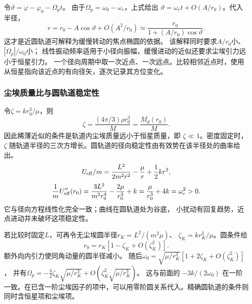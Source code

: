 \documentclass[UTF8,fontset=fandol,a4paper,11pt]{ctexart}
\begin{document}
令$\vartheta=\varphi-\varphi_0-\Omega_pt$。
由于$\Omega_p=\omega_0-\omega_r$，上式给出
$\vartheta=\omega_rt+O(A/r_0)$。代入半径，
\[
r=r_0-A\cos\vartheta+O(A^2/r_0)
\simeq\frac{r_0}{1+(A/r_0)\cos\vartheta}.
\]
这才是近圆轨道可解释为缓慢转动的焦点椭圆的依据。
该解释同时要求$A/r_0$小、$|\Omega_p|/\omega_0$小；
线性振动频率适用于小径向振幅，缓慢进动的近似还要求尘埃引力远小于恒星引力。
一个径向周期中取一次近点、一次远点。比较相邻近点时，使用从恒星指向该近点的有向径矢，逐次记录其方位变化。

\subsubsection*{尘埃质量比与圆轨道稳定性}
令$\zeta=k r_0^3/\mu$，则
\[
\zeta=\frac{(4\pi/3)\rho r_0^3}{M}
=\frac{M_d(r_0)}M.
\]
因此稀薄近似的条件是轨道内尘埃质量远小于恒星质量，即 $\zeta\ll1$。密度固定时，$\zeta$ 随轨道半径的三次方增长。圆轨道的径向稳定性由有效势在该半径处的曲率给出。
\[
U_{\rm eff}/m=\frac{L^2}{2m^2r^2}-\frac{\mu}r+\frac12kr^2,
\]
\[
\frac1mU_{\rm eff}''(r_0)
=\frac{3L^2}{m^2r_0^4}-\frac{2\mu}{r_0^3}+k
=\frac\mu{r_0^3}+4k=\omega_r^2>0.
\]
它与径向方程线性化完全一致；曲线在圆轨道处为谷底，
小扰动有回复趋势，近点进动并未破坏这项稳定性。

若比较时固定$L$，可再令无尘埃圆半径$r_K=L^2/(m^2\mu)$、
$\zeta_K=kr_K^3/\mu$。圆条件给
\[
r_0=r_K[1-\zeta_K+O(\zeta_K^2)].
\]
额外向内引力使同角动量的圆半径减小。
随后$\omega_0=\sqrt{\mu/r_K^3}[1+2\zeta_K+O(\zeta_K^2)]$，
并有$\Omega_p=-\tfrac32\zeta_K\sqrt{\mu/r_K^3}+O(\zeta_K^2\sqrt{\mu/r_K^3})$。
这与前面的 $-3k/(2\omega_0)$ 在一阶一致。在已含一阶尘埃因子的项中，可以用零阶圆关系代入。精确圆轨道的条件则同时含恒星项和尘埃项。
\end{document}
